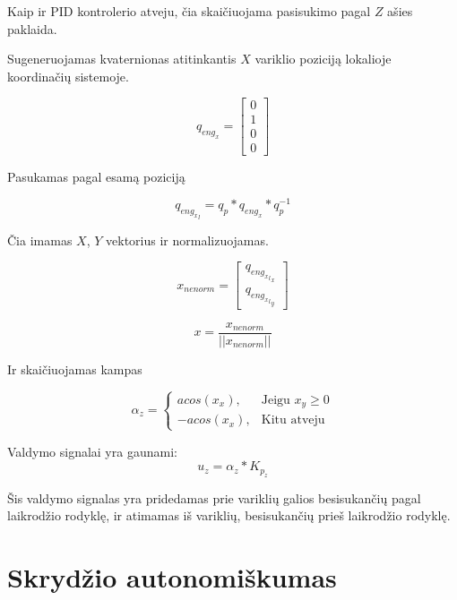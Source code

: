 \documentclass[12pt, a4paper, lithuanian, final]{article}
\begin{document}
Kaip ir PID kontrolerio atveju, čia skaičiuojama pasisukimo pagal $Z$ ašies paklaida.

Sugeneruojamas kvaternionas atitinkantis $X$ variklio poziciją lokalioje koordinačių sistemoje.

\begin{equation}
	q_{eng_x} = \left[
		\begin{array}{c}
			0 \\
			1 \\
			0 \\
			0
		\end{array}
	\right]
\end{equation}

Pasukamas pagal esamą poziciją

\begin{equation}
	q_{{eng_x}_l} = q_p * q_{eng_x} * q_p^{-1}
\end{equation}

Čia imamas $X$, $Y$ vektorius ir normalizuojamas.

\begin{equation}
	x_{nenorm} = \left[
		\begin{array}{c}
			q_{{{eng_x}_l}_x} \\
			q_{{{eng_x}_l}_y}
		\end{array}
	\right]
\end{equation}

\begin{equation}
	x = \dfrac{x_{nenorm}}{||x_{nenorm}||}
\end{equation}

Ir skaičiuojamas kampas

\begin{equation}
	\alpha_z = \begin{cases}
		acos(x_x), & \text{Jeigu } x_y \geq 0\\
		-acos(x_x), & \text{Kitu atveju}
	\end{cases}
\end{equation}

Valdymo signalai yra gaunami: 
\begin{equation}
	u_z = \alpha_z * K_{p_z}
\end{equation}

Šis valdymo signalas yra pridedamas prie variklių galios besisukančių pagal laikrodžio rodyklę, ir atimamas iš variklių, besisukančių prieš laikrodžio rodyklę.




\section{Skrydžio autonomiškumas}
\end{document}
